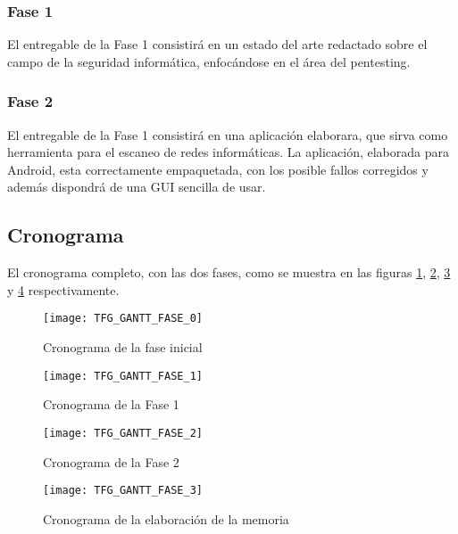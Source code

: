 \subsubsection{Fase 1}
El entregable de la Fase 1 consistirá en un estado del arte redactado sobre el campo de la seguridad informática, enfocándose en el área del pentesting.

\subsubsection{Fase 2}
El entregable de la Fase 1 consistirá en una aplicación elaborara, que sirva como herramienta para el escaneo de redes informáticas. La aplicación, elaborada para Android, esta correctamente empaquetada, con los posible fallos corregidos y además dispondrá de una GUI sencilla de usar.

\subsection{Cronograma}
El cronograma completo, con las dos fases, como se muestra en las figuras \ref{fig:gantt0}, \ref{fig:gantt1}, \ref{fig:gantt2} y \ref{fig:gantt3} respectivamente.

\begin{figure}[H]
	\centering
	\texttt{[image: TFG\_GANTT\_FASE\_0]}
	\caption{Cronograma de la fase inicial}
	\label{fig:gantt0}
\end{figure}

\begin{landscape}

\begin{figure}[H]
	\centering
	\texttt{[image: TFG\_GANTT\_FASE\_1]}
	\caption{Cronograma de la Fase 1}
	\label{fig:gantt1}
\end{figure}

\begin{figure}[H]
	\centering
	\texttt{[image: TFG\_GANTT\_FASE\_2]}
	\caption{Cronograma de la Fase 2}
	\label{fig:gantt2}
\end{figure}

\end{landscape}

\begin{figure}[H]
	\centering
	\texttt{[image: TFG\_GANTT\_FASE\_3]}
	\caption{Cronograma de la elaboración de la memoria}
	\label{fig:gantt3}
\end{figure}



